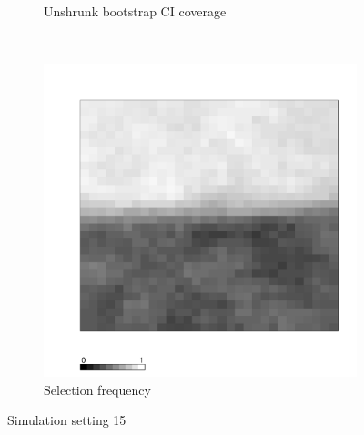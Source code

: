 \documentclass[authoryear, review, 11pt]{elsarticle}
\begin{document}
\begin{figure}
\begin{subfigure}[b]{0.45\textwidth}
		\caption{Unshrunk bootstrap CI coverage}
	\end{subfigure}%
	~ %
	\begin{subfigure}[b]{0.45\textwidth}
	\centering
		\includegraphics[width=\textwidth]{../../figures/simulation/X1.15.15.selection.pdf}
		\caption{Selection frequency}
	\end{subfigure}
	\caption{Simulation setting 15}
\end{figure}
\end{document}
